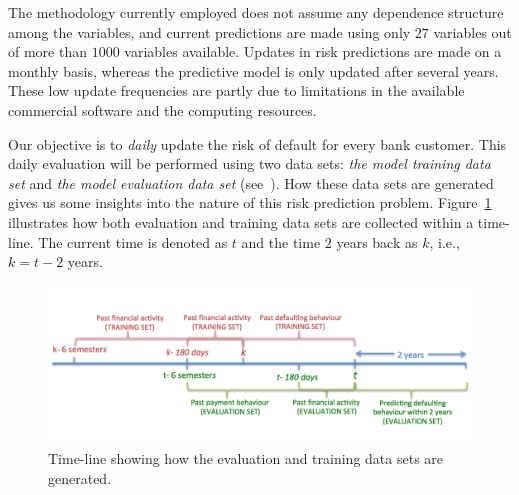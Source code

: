 The methodology currently employed does not assume any dependence structure among the variables, and current predictions are made using only $27$ variables out of more than $1000$ variables available. Updates in risk predictions are made on a monthly basis, whereas the predictive model is only updated after several years. These low update frequencies are partly due to limitations in the available commercial software and the computing resources.

Our objective is to \textit{daily} update the risk of default for every bank customer. This daily evaluation will be performed using two data sets: \textit{the model training data set} and \textit{the model evaluation data set} (see~\cite{Fer14b}). How these data sets are generated gives us some insights into the nature of this risk prediction problem. Figure~\ref{Figure:CajaMarTimeLine} illustrates how both evaluation and training data sets are collected within a time-line. The current time is denoted as $t$ and the time $2$ years back as $k$, i.e., $k=t-2$ years. 

\begin{figure}[htbp]
\centering
\includegraphics[scale=0.65]{figures/CajaMarTimeLine}
\caption{\label{Figure:CajaMarTimeLine}Time-line showing how the evaluation and training data sets are generated.}
\end{figure}


